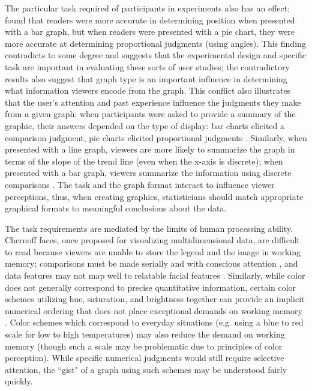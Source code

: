 \documentclass[11pt]{isuthesis}\usepackage[]{graphicx}\usepackage[]{color}
\begin{document}
The particular task required of participants in experiments also has an effect; \citet{simkin1987information} found that readers were more accurate in determining position when presented with a bar graph, but when readers were presented with a pie chart, they were more accurate at determining proportional judgments (using angles). This finding contradicts \citet{cleveland:1984} to some degree and suggests that the experimental design and specific task are important in evaluating these sorts of user studies; the contradictory results also suggest that graph type is an important influence in determining what information viewers encode from the graph. This conflict also illustrates that the user's attention and past experience influence the judgments they make from a given graph: when participants were asked to provide a summary of the graphic, their answers depended on the type of display: bar charts elicited a comparison judgment, pie charts elicited proportional judgments \citep{simkin1987information}. Similarly, when presented with a line graph, viewers are more likely to summarize the graph in terms of the slope of the trend line (even when the x-axis is discrete); when presented with a bar graph, viewers summarize the information using discrete comparisons \citep{carswell1987information, shah2005cambridge}. The task and the graph format interact to influence viewer perceptions, thus, when creating graphics, statisticians should match appropriate graphical formats to meaningful conclusions about the data. 

The task requirements are mediated by the limits of human processing ability. Chernoff faces, once proposed for visualizing multidimensional data, are difficult to read because viewers are unable to store the legend and the image in working memory; comparisons must be made serially and with conscious attention \citep{shah2005cambridge}, and data features may not map well to relatable facial features \citep{lewandowsky1989perception}. Similarly, while color does not generally correspond to precise quantitative information, certain color schemes utilizing hue, saturation, and brightness together can provide an implicit numerical ordering that does not place exceptional demands on working memory \citep{shah2005cambridge}. Color schemes which correspond to everyday situations (e.g. using a blue to red scale for low to high temperatures) may also reduce the demand on working memory (though such a scale may be problematic due to principles of color perception). While specific numerical judgments would still require selective attention, the ``gist" of a graph using such schemes may be understood fairly quickly. 
\end{document}
